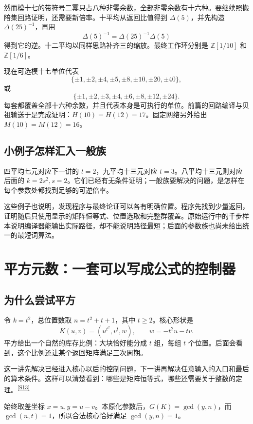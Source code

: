 \documentclass[11pt,a4paper,oneside,openany]{book}
\newcommand{\Z}{\mathbb Z}\newcommand{\Q}{\mathbb Q}\newcommand{\F}{\mathbb F}\newcommand{\CC}{\mathbb C}
\newcommand{\src}[1]{\textsuperscript{\hyperref[source:#1]{[#1]}}}
\theoremstyle{definition}\newtheorem{example}[theorem]{例}\newtheorem{conjecture}[theorem]{猜想}
\numberwithin{equation}{chapter}\setcounter{tocdepth}{1}
\begin{document}
然而模十七的带符号二幂只占八种非零余数，全部非零余数有十六种。要继续照搬陪集回路证明，还需要新倍率。十平均从返回比值得到 $\Delta(5)$，并先构造 $\Delta(25)^{-1}$，再用
\[\Delta(5)^{-1}=\Delta(25)^{-1}\Delta(5)
\]
得到它的逆。十二平均以同样思路补齐三的缩放。最终工作环分别是 $\Z[1/10]$ 和 $\Z[1/6]$。

现在可选模十七单位代表
\[
\{\pm1,\pm2,\pm4,\pm5,\pm8,\pm10,\pm20,\pm40\},
\]
或
\[
\{\pm1,\pm2,\pm3,\pm4,\pm6,\pm8,\pm12,\pm24\}.
\]
每套都覆盖全部十六种余数，并且代表本身是可执行的单位。前篇的回路编译与贝祖输送于是完成证明：$H(10)=H(12)=17$。固定网络另外给出 $M(10)=M(12)=16$。

\section{小例子怎样汇入一般族}
四平均七元对应下一讲的 $t=2$，九平均十三元对应 $t=3$。八平均十三元则对应后面的 $k=2s^2,s=2$。它们已经有无条件证明；一般族要解决的问题，是怎样在每个参数处都找到足够的可逆倍率。

这些例子也说明，发现程序与最终论证可以各有明确位置。程序先找到少量返回，证明随后只使用显示的矩阵恒等式、位置选取和完整群覆盖。原始运行中的千步样本说明编译器能输出实际路径，却不能说明路径最短；后面的参数族也尚未给出统一的最短词算法。


\chapter{平方元数：一套可以写成公式的控制器}\label{ch:square}
\section{为什么尝试平方}
令 $k=t^2$，总位置数取 $n=t^2+t+1$，其中 $t\ge2$。核心形状是
\[K(u,v)=(u^{t^2},v^t,w),\qquad w=-t^2u-tv.
\]
平方给出一个自然的库存比例：大块恰好能分成 $t$ 组，每组 $t$ 个位置。后面会看到，这个比例还让某个返回矩阵满足三次周期。

这一讲先解决已经进入核心以后的控制问题，下一讲再解决任意输入的入口和最后的算术条件。这样可以清楚看到：哪些是矩阵恒等式，哪些还需要关于整数的定理。\src{S13}

始终取差坐标 $x=u,y=u-v$。本原化参数后，$G(K)=\gcd(y,n)$，而 $\gcd(n,t)=1$，所以合法核心恰好满足 $\gcd(y,n)=1$。
\end{document}

